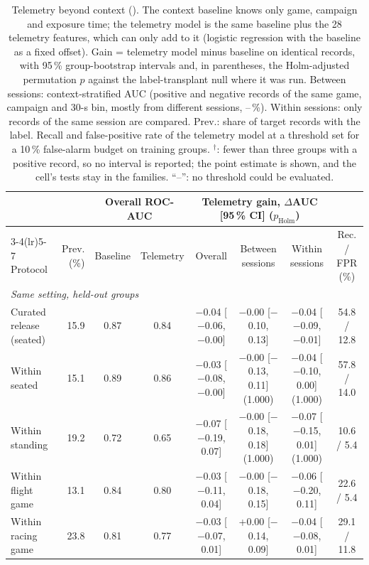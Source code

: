 \begin{table}[t]
\centering
\footnotesize
\caption{Telemetry beyond context (\sevtwo{}). The context baseline knows only game, campaign and exposure time; the telemetry model is the same baseline plus the 28 telemetry features, which can only add to it (logistic regression with the baseline as a fixed offset). Gain = telemetry model minus baseline on identical records, with 95\,\% group-bootstrap intervals and, in parentheses, the Holm-adjusted permutation $p$ against the label-transplant null where it was run. Between sessions: context-stratified AUC (positive and negative records of the same game, campaign and 30-s bin, mostly from different sessions, --\,\%). Within sessions: only records of the same session are compared. Prev.: share of target records with the label. Recall and false-positive rate of the telemetry model at a threshold set for a 10\,\% false-alarm budget on training groups. $^\dagger$: fewer than three groups with a positive record, so no interval is reported; the point estimate is shown, and the cell's tests stay in the families. ``--'': no threshold could be evaluated.}
\label{tab:gain}
\setlength{\tabcolsep}{1.5pt}
\begin{tabular}{@{}lrcccccc@{}}
\toprule
 & & \multicolumn{2}{c}{Overall ROC-AUC} & \multicolumn{3}{c}{Telemetry gain, $\Delta$AUC [95\,\% CI] ($p_{\mathrm{Holm}}$)} & \\
\cmidrule(lr){3-4}\cmidrule(lr){5-7}
Protocol & Prev. (\%) & Baseline & Telemetry & Overall & Between sessions & Within sessions & Rec. / FPR (\%) \\
\midrule
\multicolumn{8}{l}{\emph{Same setting, held-out groups}} \\
Curated release (seated) & 15.9 & 0.87 & 0.84 & $-$0.04 [$-$0.06, $-$0.00] & $-$0.00 [$-$0.10, 0.13] & $-$0.04 [$-$0.09, $-$0.01] & 54.8 / 12.8 \\
Within seated & 15.1 & 0.89 & 0.86 & $-$0.03 [$-$0.08, $-$0.00] & $-$0.00 [$-$0.13, 0.11] (1.000) & $-$0.04 [$-$0.10, 0.00] (1.000) & 57.8 / 14.0 \\
Within standing & 19.2 & 0.72 & 0.65 & $-$0.07 [$-$0.19, 0.07] & $-$0.00 [$-$0.18, 0.18] (1.000) & $-$0.07 [$-$0.15, 0.01] (1.000) & 10.6 / 5.4 \\
Within flight game & 13.1 & 0.84 & 0.80 & $-$0.03 [$-$0.11, 0.04] & $-$0.00 [$-$0.18, 0.15] & $-$0.06 [$-$0.20, 0.11] & 22.6 / 5.4 \\
Within racing game & 23.8 & 0.81 & 0.77 & $-$0.03 [$-$0.07, 0.01] & +0.00 [$-$0.14, 0.09] & $-$0.04 [$-$0.08, 0.01] & 29.1 / 11.8 \\

\end{tabular}
\end{table}
